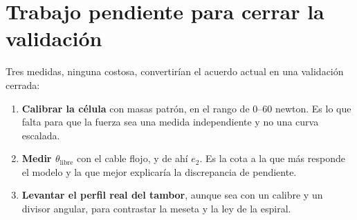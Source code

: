 \section{Trabajo pendiente para cerrar la validación}

Tres medidas, ninguna costosa, convertirían el acuerdo actual en una validación cerrada:

\begin{enumerate}
  \item \textbf{Calibrar la célula} con masas patrón, en el rango de \numrange{0}{60}{} newton. Es
        lo que falta para que la fuerza sea una medida independiente y no una curva escalada.
  \item \textbf{Medir $\theta_{\text{libre}}$} con el cable flojo, y de ahí $e_2$. Es la cota a la
        que más responde el modelo y la que mejor explicaría la discrepancia de pendiente.
  \item \textbf{Levantar el perfil real del tambor}, aunque sea con un calibre y un divisor angular,
        para contrastar la meseta y la ley de la espiral.
\end{enumerate}
